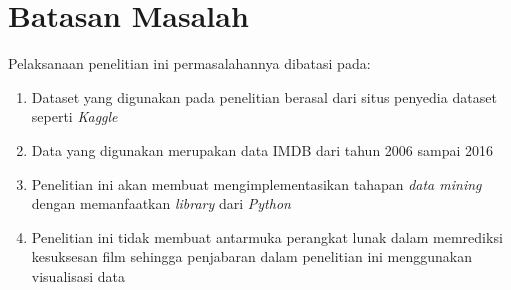 \section{Batasan Masalah}
\label{sec:batasan} 
Pelaksanaan penelitian ini permasalahannya dibatasi pada: 

\begin{enumerate}
\item Dataset yang digunakan pada penelitian berasal dari situs penyedia dataset seperti \textit{Kaggle}
\item Data yang digunakan merupakan data IMDB dari tahun 2006 sampai 2016
\item Penelitian ini akan membuat mengimplementasikan tahapan \textit{data mining} dengan memanfaatkan \textit{library} dari \textit{Python}
\item Penelitian ini tidak membuat antarmuka perangkat lunak dalam memrediksi kesuksesan film sehingga penjabaran dalam penelitian ini menggunakan visualisasi data 

\end{enumerate}



